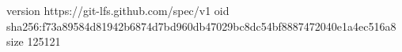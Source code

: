 version https://git-lfs.github.com/spec/v1
oid sha256:f73a89584d81942b6874d7bd960db47029bc8dc54bf8887472040e1a4ec516a8
size 125121
